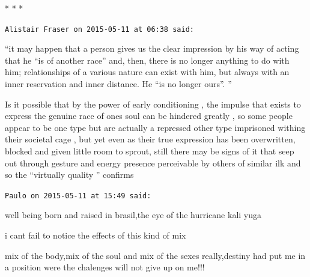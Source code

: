 
\begin{center}* * *\end{center}

\begin{footnotesize}
\begin{sffamily}
\texttt{Alistair Fraser on 2015-05-11 at 06:38 said:}

``it may happen that a person gives us the clear impression by his way of acting that he ``is of another race'' and, then, there is no longer anything to do with him; relationships of a various nature can exist with him, but always with an inner reservation and inner distance. He ``is no longer ours''. ''

Is it possible that by the power of early conditioning , the impulse that exists to express the genuine race of ones soul can be hindered greatly , so some people appear to be one type but are actually a repressed other type imprisoned withing their societal cage , but yet even as their true expression has been overwritten, blocked and given little room to sprout, still there may be signs of it that seep out through gesture and energy presence perceivable by others of similar ilk and so the ``virtually quality '' confirms

\hfill

\texttt{Paulo on 2015-05-11 at 15:49 said:}

well being born and raised in brasil,the eye of the hurricane kali yuga

i cant fail to notice the effects of this kind of mix

mix of the body,mix of the soul and mix of the sexes really,destiny had put me in a position were the chalenges will not give up on me!!!

\end{sffamily}
\end{footnotesize}

